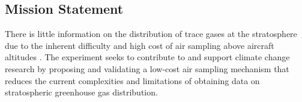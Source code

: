 \subsection{Mission Statement}

There is little information on the distribution of trace gases at the stratosphere due to the inherent difficulty and high cost of air sampling above aircraft altitudes \cite{Trace}. The experiment seeks to contribute to and support climate change research by proposing and validating a low-cost air sampling mechanism that reduces the current complexities and limitations of obtaining data on stratospheric greenhouse gas distribution.